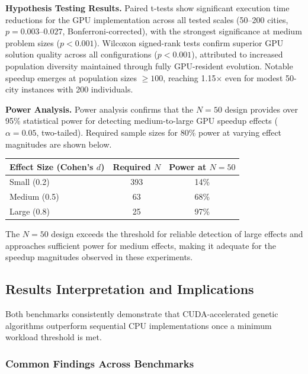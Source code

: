 \textbf{Hypothesis Testing Results.} Paired t-tests show significant execution time reductions for the GPU implementation across all tested scales (50--200 cities, $p = 0.003$--$0.027$, Bonferroni-corrected), with the strongest significance at medium problem sizes ($p < 0.001$). Wilcoxon signed-rank tests confirm superior GPU solution quality across all configurations ($p < 0.001$), attributed to increased population diversity maintained through fully GPU-resident evolution. Notable speedup emerges at population sizes $\geq 100$, reaching 1.15$\times$ even for modest 50-city instances with 200 individuals.

\textbf{Power Analysis.} Power analysis confirms that the $N = 50$ design provides over 95\% statistical power for detecting medium-to-large GPU speedup effects ($\alpha = 0.05$, two-tailed). Required sample sizes for 80\% power at varying effect magnitudes are shown below.

\begin{center}
\begin{tabular}{@{}lcc@{}}
\toprule
\textbf{Effect Size (Cohen's $d$)} & \textbf{Required $N$} & \textbf{Power at $N=50$} \\
\midrule
Small (0.2) & 393 & 14\% \\
Medium (0.5) & 63 & 68\% \\
Large (0.8) & 25 & 97\% \\
\bottomrule
\end{tabular}
\end{center}

The $N = 50$ design exceeds the threshold for reliable detection of large effects and approaches sufficient power for medium effects, making it adequate for the speedup magnitudes observed in these experiments.


\subsection{Results Interpretation and Implications}



Both benchmarks consistently demonstrate that CUDA-accelerated genetic algorithms outperform sequential CPU implementations once a minimum workload threshold is met.

\subsubsection*{Common Findings Across Benchmarks}

